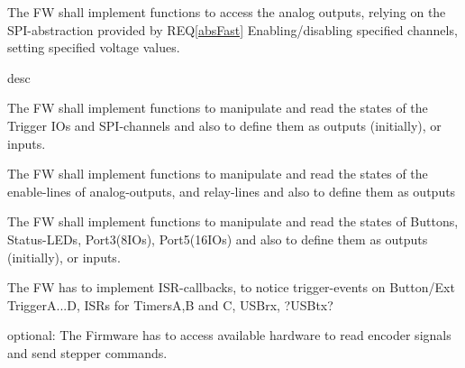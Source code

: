 	{ The FW shall implement functions to access the analog outputs, relying on the SPI-abstraction provided by REQ\ref{absFast} Enabling/disabling specified channels, setting specified voltage values.		}

	{ desc }

	{ The FW shall implement functions to manipulate and read the states of the Trigger IOs and SPI-channels and also to define them as outputs (initially), or inputs.}

	{ The FW shall implement functions to manipulate and read the states of the enable-lines of analog-outputs, and relay-lines and also to define them as outputs }

	{ The FW shall implement functions to manipulate and read the states of Buttons, Status-LEDs, Port3(8IOs), Port5(16IOs)  and also to define them as outputs (initially), or inputs. }

	{ The FW has to implement ISR-callbacks, to notice trigger-events on Button/Ext TriggerA...D, ISRs for TimersA,B and C, USBrx, ?USBtx? }

	{ optional: The Firmware has to access available hardware to read encoder signals and send stepper commands. }


